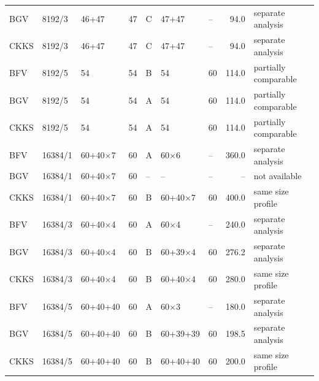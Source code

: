 \begin{longtable}{@{}lllllllrl@{}}
BGV & 8192/3 & 46+47 & 47 & C & 47+47 & -- & 94.0 & separate analysis \\
CKKS & 8192/3 & 46+47 & 47 & C & 47+47 & -- & 94.0 & separate analysis \\
BFV & 8192/5 & 54 & 54 & B & 54 & 60 & 114.0 & partially comparable \\
BGV & 8192/5 & 54 & 54 & A & 54 & 60 & 114.0 & partially comparable \\
CKKS & 8192/5 & 54 & 54 & A & 54 & 60 & 114.0 & partially comparable \\
BFV & 16384/1 & 60+40$\times$7 & 60 & A & 60$\times$6 & -- & 360.0 & separate analysis \\
BGV & 16384/1 & 60+40$\times$7 & 60 & -- & -- & -- & -- & not available \\
CKKS & 16384/1 & 60+40$\times$7 & 60 & B & 60+40$\times$7 & 60 & 400.0 & same size profile \\
BFV & 16384/3 & 60+40$\times$4 & 60 & A & 60$\times$4 & -- & 240.0 & separate analysis \\
BGV & 16384/3 & 60+40$\times$4 & 60 & B & 60+39$\times$4 & 60 & 276.2 & separate analysis \\
CKKS & 16384/3 & 60+40$\times$4 & 60 & B & 60+40$\times$4 & 60 & 280.0 & same size profile \\
BFV & 16384/5 & 60+40+40 & 60 & A & 60$\times$3 & -- & 180.0 & separate analysis \\
BGV & 16384/5 & 60+40+40 & 60 & B & 60+39+39 & 60 & 198.5 & separate analysis \\
CKKS & 16384/5 & 60+40+40 & 60 & B & 60+40+40 & 60 & 200.0 & same size profile \\
\bottomrule
\end{longtable}

